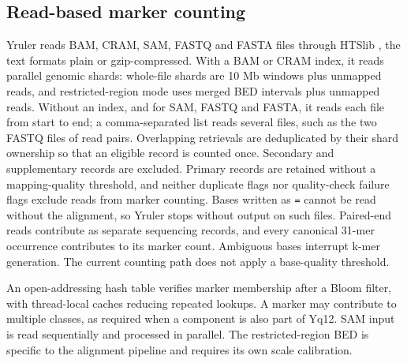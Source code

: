 
\subsection{Read-based marker counting}\label{sec:m-counting}
Yruler reads BAM, CRAM, SAM, FASTQ and FASTA files through HTSlib \cite{Bonfield2021}, the text formats plain or gzip-compressed. With a BAM or CRAM index, it reads parallel genomic shards: whole-file shards are 10 Mb windows plus unmapped reads, and restricted-region mode uses merged BED intervals plus unmapped reads. Without an index, and for SAM, FASTQ and FASTA, it reads each file from start to end; a comma-separated list reads several files, such as the two FASTQ files of read pairs. Overlapping retrievals are deduplicated by their shard ownership so that an eligible record is counted once. Secondary and supplementary records are excluded. Primary records are retained without a mapping-quality threshold, and neither duplicate flags nor quality-check failure flags exclude reads from marker counting. Bases written as \texttt{=} cannot be read without the alignment, so Yruler stops without output on such files. Paired-end reads contribute as separate sequencing records, and every canonical 31-mer occurrence contributes to its marker count. Ambiguous bases interrupt k-mer generation. The current counting path does not apply a base-quality threshold.

An open-addressing hash table verifies marker membership after a Bloom filter, with thread-local caches reducing repeated lookups. A marker may contribute to multiple classes, as required when a component is also part of Yq12.  SAM input is read sequentially and processed in parallel. The restricted-region BED is specific to the alignment pipeline and requires its own scale calibration.

